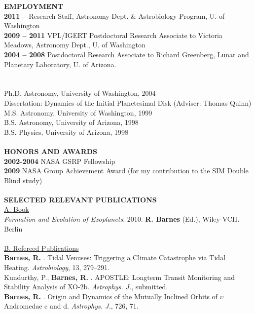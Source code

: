 \documentclass[12pt]{article}
\begin{document}
\noindent
{\bf EMPLOYMENT} \\
\textbf{2011 -- } Research Staff, Astronomy Dept. \& Astrobiology Program, U. of Washington\\
\textbf{2009 -- 2011} VPL/IGERT Postdoctoral Research Associate to 
Victoria Meadows, Astronomy Dept., U. of Washington\\
\textbf{2004 -- 2008} Postdoctoral Research Associate to Richard 
Greenberg, Lunar and Planetary Laboratory, U. of Arizona.\\
\\
 \\
Ph.D. Astronomy, University of Washington, 2004\\
\indent Dissertation: Dynamics of the Initial Planetesimal Disk (Adviser: 
Thomas Quinn)\\
M.S. Astronomy, University of Washington, 1999\\
B.S. Astronomy, University of Arizona, 1998 \\
B.S. Physics, University of Arizona, 1998 \\
\\
\textbf{HONORS AND AWARDS}\\
\textbf{2002-2004} NASA GSRP Fellowship\\
\textbf{2009} NASA Group Achievement Award (for my contribution to the SIM Double Blind study)\\\\
\noindent
{\bf SELECTED RELEVANT PUBLICATIONS} \\
\underline{A. Book}\\
{\it Formation and Evolution of Exoplanets}. 2010. \textbf{R. Barnes} (Ed.),
Wiley-VCH. Berlin\\\\
\underline{B. Refereed Publications}\\
\textbf{Barnes, R.} . Tidal Venuses: Triggering a Climate Catastrophe via Tidal Heating. {\it Astrobiology}, 13, 
\vspace{0.1cm}
279--291.\\
Kundurthy, P., \textbf{Barnes, R.} . APOSTLE: Longterm Transit Monitoring and Stability Analysis of XO-2b. {\it Astrophys. J.}, 
\vspace{0.1cm}
submitted.\\
\textbf{Barnes, R.} . Origin and Dynamics of the Mutually Inclined Orbits of $\upsilon$ Andromedae c and d. {\it Astrophys. J.}, 
\vspace{0.1cm}
726, 71.\\
\end{document}

